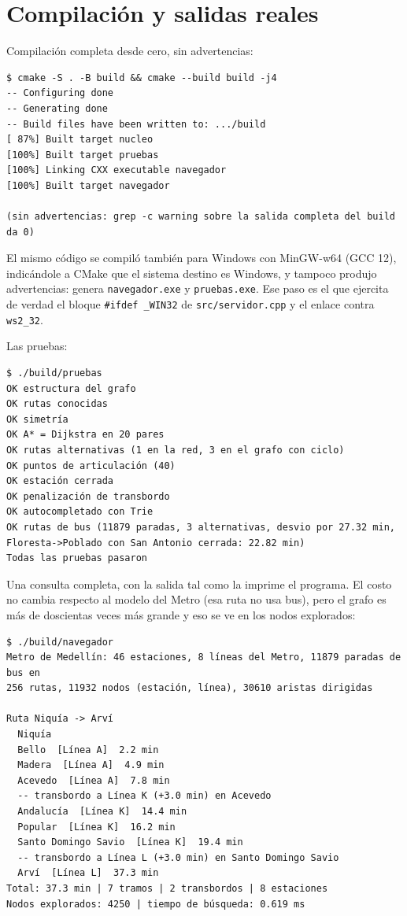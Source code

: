 \documentclass[11pt,a4paper]{article}
\newcommand{\arch}[1]{\texttt{#1}}
\begin{document}
\appendix

\section{Compilación y salidas reales}
\label{anexo:compila}

Compilación completa desde cero, sin advertencias:

\begin{lstlisting}[style=term]
$ cmake -S . -B build && cmake --build build -j4
-- Configuring done
-- Generating done
-- Build files have been written to: .../build
[ 87%] Built target nucleo
[100%] Built target pruebas
[100%] Linking CXX executable navegador
[100%] Built target navegador

(sin advertencias: grep -c warning sobre la salida completa del build da 0)
\end{lstlisting}

El mismo código se compiló también para Windows con MinGW-w64 (GCC 12),
indicándole a CMake que el sistema destino es Windows, y tampoco produjo
advertencias: genera \arch{navegador.exe} y \arch{pruebas.exe}. Ese paso es el
que ejercita de verdad el bloque \arch{\#ifdef \_WIN32} de
\arch{src/servidor.cpp} y el enlace contra \arch{ws2\_32}.

Las pruebas:

\begin{lstlisting}[style=term]
$ ./build/pruebas
OK estructura del grafo
OK rutas conocidas
OK simetría
OK A* = Dijkstra en 20 pares
OK rutas alternativas (1 en la red, 3 en el grafo con ciclo)
OK puntos de articulación (40)
OK estación cerrada
OK penalización de transbordo
OK autocompletado con Trie
OK rutas de bus (11879 paradas, 3 alternativas, desvio por 27.32 min, Floresta->Poblado con San Antonio cerrada: 22.82 min)
Todas las pruebas pasaron
\end{lstlisting}

Una consulta completa, con la salida tal como la imprime el programa. El costo no
cambia respecto al modelo del Metro (esa ruta no usa bus), pero el grafo es más de
doscientas veces más grande y eso se ve en los nodos explorados:

\begin{lstlisting}[style=term]
$ ./build/navegador
Metro de Medellín: 46 estaciones, 8 líneas del Metro, 11879 paradas de bus en
256 rutas, 11932 nodos (estación, línea), 30610 aristas dirigidas

Ruta Niquía -> Arví
  Niquía
  Bello  [Línea A]  2.2 min
  Madera  [Línea A]  4.9 min
  Acevedo  [Línea A]  7.8 min
  -- transbordo a Línea K (+3.0 min) en Acevedo
  Andalucía  [Línea K]  14.4 min
  Popular  [Línea K]  16.2 min
  Santo Domingo Savio  [Línea K]  19.4 min
  -- transbordo a Línea L (+3.0 min) en Santo Domingo Savio
  Arví  [Línea L]  37.3 min
Total: 37.3 min | 7 tramos | 2 transbordos | 8 estaciones
Nodos explorados: 4250 | tiempo de búsqueda: 0.619 ms
\end{lstlisting}
\end{document}
